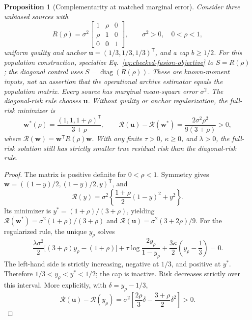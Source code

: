 \documentclass[10pt]{article}
\newtheorem{proposition}{Proposition}
\DeclareMathOperator{\diag}{diag}
\begin{document}
\begin{proposition}[Complementarity at matched marginal error]
\label{prop:matched-marginal-gain}
Consider three unbiased sources with
\begin{equation}
 R(\rho)=\sigma^2
 \begin{bmatrix}1&\rho&0\\\rho&1&0\\0&0&1\end{bmatrix},
 \qquad \sigma^2>0,\quad 0<\rho<1,
 \label{eq:matched-marginal-matrix}
\end{equation}
uniform quality and anchor
$\boldsymbol u=(1/3,1/3,1/3)^{\mathsf T}$, and a cap $b\ge1/2$.
For this population construction, specialize
Eq.~\eqref{eq:checked-fusion-objective} to $S=R(\rho)$; the diagonal control
uses $S=\diag(R(\rho))$. These are known-moment inputs, not an assertion
that the operational archive estimator equals the population matrix.
Every source has marginal mean-square error $\sigma^2$.
The diagonal-risk rule chooses $\boldsymbol u$.
Without quality or anchor regularization, the full-risk minimizer is
\begin{equation}
 \boldsymbol w^*(\rho)=
 \frac{(1,1,1+\rho)^{\mathsf T}}{3+\rho},
 \qquad
 \mathcal R(\boldsymbol u)-\mathcal R(\boldsymbol w^*)
 =\frac{2\sigma^2\rho^2}{9(3+\rho)}>0,
 \label{eq:matched-marginal-gap}
\end{equation}
where $\mathcal R(\boldsymbol w)=\boldsymbol w^{\mathsf T}R(\rho)\boldsymbol w$.
With any finite $\tau>0$, $\kappa\ge0$, and $\lambda>0$, the full-risk
solution still has strictly smaller true residual risk than the
diagonal-risk rule.
\end{proposition}

\begin{proof}
The matrix is positive definite for $0<\rho<1$. Symmetry gives
$\boldsymbol w=((1-y)/2,(1-y)/2,y)^{\mathsf T}$, and
\begin{equation}
 \mathcal R(y)=\sigma^2\left\{
 \frac{1+\rho}{2}(1-y)^2+y^2\right\}.
\end{equation}
Its minimizer is $y^*=(1+\rho)/(3+\rho)$, yielding
$\mathcal R(\boldsymbol w^*)=\sigma^2(1+\rho)/(3+\rho)$ and
$\mathcal R(\boldsymbol u)=\sigma^2(3+2\rho)/9$.
For the regularized rule, the unique $y_\rho$ solves
\begin{equation}
 \frac{\lambda\sigma^2}{2}
 \big[(3+\rho)y_\rho-(1+\rho)\big]
 +\tau\log\frac{2y_\rho}{1-y_\rho}
 +\frac{3\kappa}{2}\left(y_\rho-\frac13\right)=0.
 \label{eq:regularized-three-source-root}
\end{equation}
The left-hand side is strictly increasing, negative at $1/3$, and positive
at $y^*$. Therefore $1/3<y_\rho<y^*<1/2$; the cap is inactive.
Risk decreases strictly over this interval. More explicitly, with
$\delta=y_\rho-1/3$,
\begin{equation}
 \mathcal R(\boldsymbol u)-\mathcal R(y_\rho)
 =\sigma^2\left[
 \frac{2\rho}{3}\delta-\frac{3+\rho}{2}\delta^2\right]>0.
 \label{eq:regularized-risk-gain}
\end{equation}
\end{proof}
\end{document}
